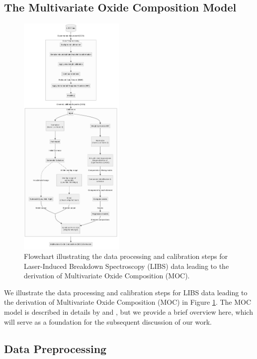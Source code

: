 \subsection{The Multivariate Oxide Composition Model}\label{sec:moc}
\begin{figure}[H]
    \centering
    \includegraphics[width=0.45\textwidth]{images/pipeline.png}
    \caption{Flowchart illustrating the data processing and calibration steps for Laser-Induced Breakdown Spectroscopy (LIBS) data leading to the derivation of Multivariate Oxide Composition (MOC).}
    \label{fig:libs_data_processing}
\end{figure}

We illustrate the data processing and calibration steps for LIBS data leading to the derivation of Multivariate Oxide Composition (MOC) in Figure \ref{fig:libs_data_processing}. The MOC model is described in details by \citet{cleggRecalibrationMarsScience2017} and \citet{andersonImprovedAccuracyQuantitative2017}, but we provide a brief overview here, which will serve as a foundation for the subsequent discussion of our work.

\subsection{Data Preprocessing}\label{sec:data_preprocessing}


